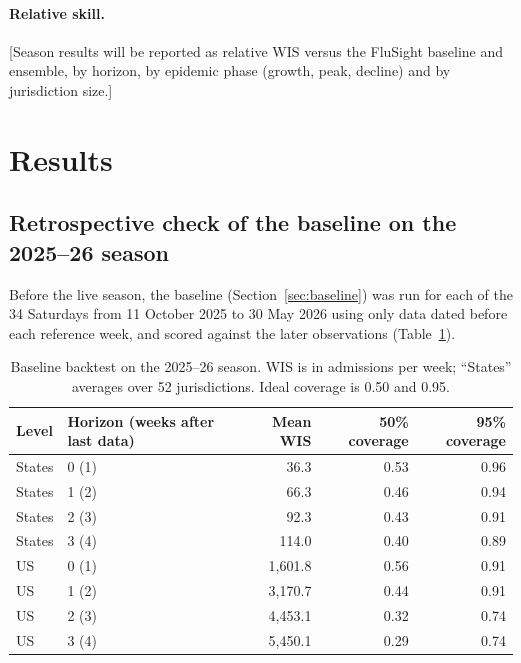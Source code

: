 \documentclass[11pt]{article}
\newcommand{\tbd}[1]{\textcolor{red!70!black}{[#1]}}
\begin{document}
\paragraph{Relative skill.} \tbd{Season results will be reported as relative WIS
versus the FluSight baseline and ensemble, by horizon, by epidemic phase (growth, peak,
decline) and by jurisdiction size.}

\section{Results}
\label{sec:results}

\subsection{Retrospective check of the baseline on the 2025--26 season}

Before the live season, the baseline (Section~\ref{sec:baseline}) was run for each of
the 34 Saturdays from 11 October 2025 to 30 May 2026 using only data dated before each
reference week, and scored against the later observations (Table~\ref{tab:backtest}).

\begin{table}[ht]
  \centering
  \caption{Baseline backtest on the 2025--26 season. WIS is in admissions per week;
  ``States'' averages over 52 jurisdictions. Ideal coverage is 0.50 and 0.95.}
  \label{tab:backtest}
  \begin{tabular}{llrrr}
    \toprule
    Level & Horizon (weeks after last data) & Mean WIS & 50\% coverage & 95\% coverage \\
    \midrule
    States & 0 (1) & 36.3  & 0.53 & 0.96 \\
    States & 1 (2) & 66.3  & 0.46 & 0.94 \\
    States & 2 (3) & 92.3  & 0.43 & 0.91 \\
    States & 3 (4) & 114.0 & 0.40 & 0.89 \\
    \midrule
    US     & 0 (1) & 1{,}601.8 & 0.56 & 0.91 \\
    US     & 1 (2) & 3{,}170.7 & 0.44 & 0.91 \\
    US     & 2 (3) & 4{,}453.1 & 0.32 & 0.74 \\
    US     & 3 (4) & 5{,}450.1 & 0.29 & 0.74 \\
    \bottomrule
  \end{tabular}
\end{table}
\end{document}
